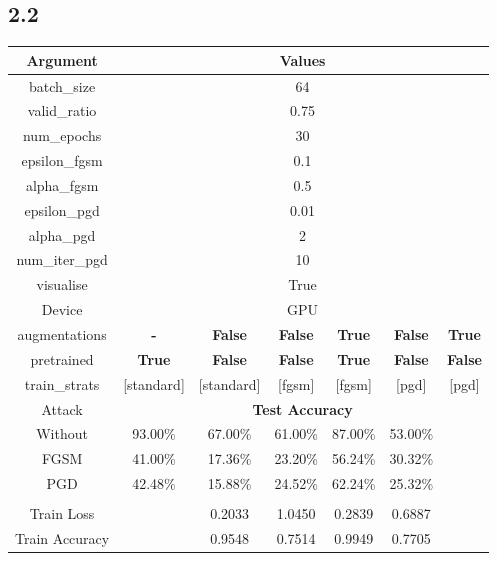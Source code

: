 \documentclass{article}
\begin{document}
\subsection*{2.2}

\begin{table}[H]
    \centering
    \begin{tabular}{|c|cccccc|}
    \hline
    \textbf{Argument} & \multicolumn{6}{|c|}{\textbf{Values}} \\
    \hline
    batch\_size &       \multicolumn{6}{c|}{64} \\
    valid\_ratio &      \multicolumn{6}{c|}{0.75} \\
    num\_epochs &       \multicolumn{6}{c|}{30} \\
    epsilon\_fgsm &     \multicolumn{6}{c|}{0.1} \\
    alpha\_fgsm &       \multicolumn{6}{c|}{0.5} \\
    epsilon\_pgd &      \multicolumn{6}{c|}{0.01} \\
    alpha\_pgd &        \multicolumn{6}{c|}{2} \\
    num\_iter\_pgd &    \multicolumn{6}{c|}{10} \\
    visualise &         \multicolumn{6}{c|}{True} \\
    Device &            \multicolumn{6}{c|}{GPU} \\
    augmentations & \textbf{-}  & \textbf{False} & \textbf{False} & \textbf{True} & \textbf{False} & \textbf{True} \\
    pretrained & \textbf{True}  & \textbf{False} & \textbf{False} & \textbf{True} & \textbf{False} & \textbf{False}\\
    train\_strats & [standard] & [standard] & [fgsm] & [fgsm] & [pgd] & [pgd]\\
    \hline
    Attack & \multicolumn{6}{c|}{\textbf{Test Accuracy}}\\
    \hline
    Without     & 93.00\% & 67.00\% & 61.00\% & 87.00\% & 53.00\% & \\
    FGSM        & 41.00\% & 17.36\% & 23.20\% & 56.24\% & 30.32\% & \\
    PGD         & 42.48\% & 15.88\% & 24.52\% & 62.24\% & 25.32\% & \\
    \hline
    \multicolumn{7}{|c|}{\textbf{}}\\
    \hline
    Train Loss                  & & 0.2033 & 1.0450 & 0.2839 & 0.6887 & \\
    Train Accuracy              & & 0.9548 & 0.7514 & 0.9949 & 0.7705 & \\

\end{tabular}
\end{table}
\end{document}
